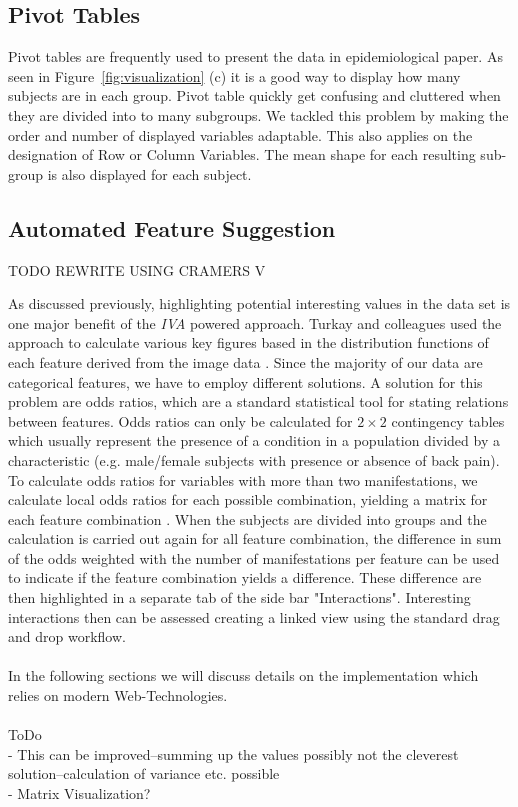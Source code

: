 \documentclass[journal]{style/vgtc} 			          %
\begin{document}
\subsection{Pivot Tables}
Pivot tables are frequently used to present the data in epidemiological paper.
%
As seen in Figure~\ref{fig:visualization} (c) it is a good way to display how many subjects are in each group.
%
Pivot table quickly get confusing and cluttered when they are divided into to many subgroups.
%
We tackled this problem by making the order and number of displayed variables adaptable.
%
This also applies on the designation of Row or Column Variables.
The mean shape for each resulting sub-group is also displayed for each subject.

\subsection{Automated Feature Suggestion}
TODO REWRITE USING CRAMERS V

As discussed previously, highlighting potential interesting values in the data set is one major benefit of the \emph{IVA} powered approach.
%
Turkay and colleagues used the approach to calculate various key figures based in the distribution functions of each feature derived from the image data \cite{Turkay2013}.
%
Since the majority of our data are categorical features, we have to employ different solutions.
%
A solution for this problem are odds ratios, which are a standard statistical tool for stating relations between features.
%
Odds ratios can only be calculated for $2\times2$ contingency tables which usually represent the presence of a condition in a population divided by a characteristic (e.g. male/female subjects with presence or absence of back pain).
%
To calculate odds ratios for variables with more than two manifestations, we calculate local odds ratios for each possible combination, yielding a matrix for each feature combination \cite{Rudas1998}.
%
When the subjects are divided into groups and the calculation is carried out again for all feature combination, the difference in sum of the odds weighted with the number of manifestations per feature can be used to indicate if the feature combination yields a difference.
%
These difference are then highlighted in a separate tab of the side bar "Interactions".
%
Interesting interactions then can be assessed creating a linked view using the standard drag and drop workflow.
\\\\
In the following sections we will discuss details on the implementation which relies on modern Web-Technologies.
\\\\
ToDo\\
- This can be improved--summing up the values possibly not the cleverest solution--calculation of variance etc. possible\\
- Matrix Visualization?
\end{document}
